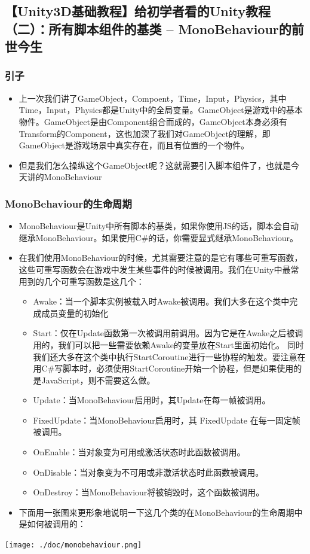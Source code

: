 \documentclass[9pt, b5paper]{article}
\begin{document}
\subsection{【Unity3D基础教程】给初学者看的Unity教程（二）：所有脚本组件的基类 -- MonoBehaviour的前世今生}
\label{sec:orgda502be}
\subsubsection{引子}
\label{sec:org05fb71a}
\begin{itemize}
\item 上一次我们讲了GameObject，Compoent，Time，Input，Physics，其中Time，Input，Physics都是Unity中的全局变量。GameObject是游戏中的基本物件。GameObject是由Component组合而成的，GameObject本身必须有Transform的Component，这也加深了我们对GameObject的理解，即GameObject是游戏场景中真实存在，而且有位置的一个物件。
\item 但是我们怎么操纵这个GameObject呢？这就需要引入脚本组件了，也就是今天讲的MonoBehaviour
\end{itemize}
\subsubsection{MonoBehaviour的生命周期}
\label{sec:orgfd5e8a2}
\begin{itemize}
\item MonoBehaviour是Unity中所有脚本的基类，如果你使用JS的话，脚本会自动继承MonoBehaviour。如果使用C\#的话，你需要显式继承MonoBehaviour。
\item 在我们使用MonoBehaviour的时候，尤其需要注意的是它有哪些可重写函数，这些可重写函数会在游戏中发生某些事件的时候被调用。我们在Unity中最常用到的几个可重写函数是这几个：
\begin{itemize}
\item Awake：当一个脚本实例被载入时Awake被调用。我们大多在这个类中完成成员变量的初始化
\item Start：仅在Update函数第一次被调用前调用。因为它是在Awake之后被调用的，我们可以把一些需要依赖Awake的变量放在Start里面初始化。 同时我们还大多在这个类中执行StartCoroutine进行一些协程的触发。要注意在用C\#写脚本时，必须使用StartCoroutine开始一个协程，但是如果使用的是JavaScript，则不需要这么做。
\item Update：当MonoBehaviour启用时，其Update在每一帧被调用。
\item FixedUpdate：当MonoBehaviour启用时，其 FixedUpdate 在每一固定帧被调用。
\item OnEnable：当对象变为可用或激活状态时此函数被调用。
\item OnDisable：当对象变为不可用或非激活状态时此函数被调用。
\item OnDestroy：当MonoBehaviour将被销毁时，这个函数被调用。
\end{itemize}
\item 下面用一张图来更形象地说明一下这几个类的在MonoBehaviour的生命周期中是如何被调用的：
\end{itemize}
\begin{center}
\texttt{[image: ./doc/monobehaviour.png]}
\end{center}
\end{document}
